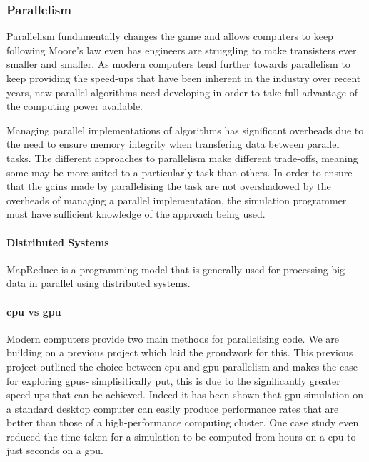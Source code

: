 \documentclass{UoYCSproject}
\begin{document}
\subsubsection{Parallelism}
Parallelism fundamentally changes the game and allows computers to keep following Moore's law even has engineers are struggling to make transisters ever smaller and smaller\cite{concurrency_revolution}.
As modern computers tend further towards parallelism to keep providing the speed-ups that have been inherent in the industry over recent years, new parallel algorithms need developing in order to take full advantage of the computing power available.

Managing parallel implementations of algorithms has significant overheads due to the need to ensure memory integrity when transfering data between parallel tasks.
The different approaches to parallelism make different trade-offs, meaning some may be more suited to a particularly task than others.
In order to ensure that the gains made by parallelising the task are not overshadowed by the overheads of managing a parallel implementation, the simulation programmer must have sufficient knowledge of the approach being used.

\paragraph{Distributed Systems}
MapReduce is a programming model that is generally used for processing big data in parallel using distributed systems.

\paragraph{\acrshort{cpu} vs \acrshort{gpu}}
Modern computers provide two main methods for parallelising code.
We are building on a previous project\cite{phil_diss} which laid the groudwork for this.
This previous project outlined the choice between \acrshort{cpu} and \acrshort{gpu} parallelism and makes the case for exploring \acrshort{gpu}s- simplisitically put, this is due to the significantly greater speed ups that can be achieved.
Indeed it has been shown that \acrshort{gpu} simulation on a standard desktop computer can easily produce performance rates that are better than those of a high-performance computing cluster\cite{flame_simulation}.
One case study even reduced the time taken for a simulation to be computed from hours on a \acrshort{cpu} to just seconds on a \acrshort{gpu}\cite{flame_keratinocyte}.
\end{document}
